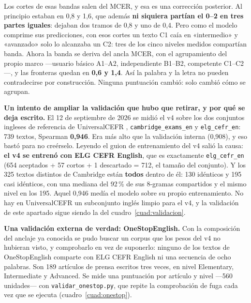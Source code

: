 \documentclass[11pt,a4paper]{article}
\newcommand{\cod}[1]{\texttt{\small #1}}
\newcommand{\pct}{\,\%}
\begin{document}
Los cortes de esas bandas salen del MCER, y esa es una corrección posterior. Al principio
estaban en 0,8 y 1,6, que además \textbf{ni siquiera partían el 0--2 en tres partes
iguales}: dejaban dos tramos de 0,8 y uno de 0,4. Pero como el modelo comprime
sus predicciones, con esos cortes un texto C1 caía en «intermedio» y «avanzado» solo lo
alcanzaba un C2: tres de los cinco niveles medidos compartían banda. Ahora la banda se
deriva del ancla MCER, con el agrupamiento del propio marco —usuario básico A1--A2,
independiente B1--B2, competente C1--C2—, y las fronteras quedan en \textbf{0,6 y 1,4}.
Así la palabra y la letra no pueden contradecirse por construcción. Ninguna puntuación
cambió: solo cambió cómo se agrupan.

\textbf{Un intento de ampliar la validación que hubo que retirar, y por qué se deja
escrito.} El 12 de septiembre de 2026 se midió el v4 sobre los dos conjuntos ingleses de
referencia de UniversalCEFR \parencite{imperial2025universalcefr}, \cod{cambridge\_exams\_en} y
\cod{elg\_cefr\_en}: 739 textos, Spearman \textbf{0,946}. Era más alto que la validación
interna (0,908), y eso bastó para no creérselo. Leyendo el guion de entrenamiento del v4
salió la causa: \textbf{el v4 se entrenó con ELG CEFR English}, que es exactamente
\cod{elg\_cefr\_en} (654 aceptados + 57 cortos + 1 descartado = 712, el tamaño del
conjunto). Y los 325 textos distintos de Cambridge están \textbf{todos} dentro de él: 130
idénticos y 195 casi idénticos, con una mediana del 92\pct{} de sus 8-gramas compartidos y
el mismo nivel en los 195. Aquel 0,946 medía el modelo sobre su propio entrenamiento. No
hay en UniversalCEFR un subconjunto inglés limpio para el v4, y la validación de este
apartado sigue siendo la del cuadro~\ref{cuad:validacion}.

\textbf{Una validación externa de verdad: OneStopEnglish.} Con la composición del anclaje ya
conocida se pudo buscar un corpus que los pesos del v4 no hubieran visto, y comprobarlo en vez
de suponerlo: ninguno de los textos de OneStopEnglish \parencite{vajjala2018onestop} comparte
con ELG CEFR English ni una secuencia de ocho palabras. Son 189 artículos de prensa escritos
tres veces, en nivel Elementary, Intermediate y Advanced. Se mide una puntuación por artículo
y nivel ---560 unidades--- con \cod{validar\_onestop.py}, que repite la comprobación de fuga
cada vez que se ejecuta (cuadro~\ref{cuad:onestop}).
\end{document}
